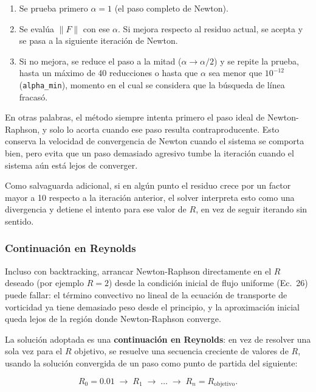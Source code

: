 \documentclass[12pt, a4paper]{article}
\begin{document}
\begin{enumerate}
  \item Se prueba primero $\alpha = 1$ (el paso completo de Newton).
  \item Se evalúa $\|F\|$ con ese $\alpha$. Si mejora respecto al residuo
        actual, se acepta y se pasa a la siguiente iteración de Newton.
  \item Si no mejora, se reduce el paso a la mitad ($\alpha \to \alpha/2$) y
        se repite la prueba, hasta un máximo de 40 reducciones o hasta que
        $\alpha$ sea menor que $10^{-12}$ (\texttt{alpha\_min}), momento en
        el cual se considera que la búsqueda de línea fracasó.
\end{enumerate}

En otras palabras, el método siempre intenta primero el paso ideal de
Newton-Raphson, y solo lo acorta cuando ese paso resulta contraproducente.
Esto conserva la velocidad de convergencia de Newton cuando el sistema se
comporta bien, pero evita que un paso demasiado agresivo tumbe la iteración
cuando el sistema aún está lejos de converger.

Como salvaguarda adicional, si en algún punto el residuo crece por un factor
mayor a 10 respecto a la iteración anterior, el solver interpreta esto como
una divergencia y detiene el intento para ese valor de $R$, en vez de seguir
iterando sin sentido.

\subsubsection{Continuación en Reynolds}
\label{ssec:continuacion}

Incluso con backtracking, arrancar Newton-Raphson directamente en el $R$
deseado (por ejemplo $R=2$) desde la condición inicial de flujo uniforme
(Ec.~26) puede fallar: el término convectivo no lineal de la ecuación de
transporte de vorticidad ya tiene demasiado peso desde el principio, y la
aproximación inicial queda lejos de la región donde Newton-Raphson converge.

La solución adoptada es una \textbf{continuación en Reynolds}: en vez de
resolver una sola vez para el $R$ objetivo, se resuelve una secuencia
creciente de valores de $R$, usando la solución convergida de un paso como
punto de partida del siguiente:

\begin{equation}
  R_0 = 0.01 \;\to\; R_1 \;\to\; \dots \;\to\; R_n = R_{\text{objetivo}}.
\end{equation}
\end{document}
